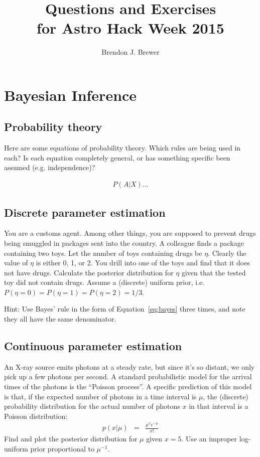 \documentclass[a4paper, 11pt]{article}
\title{Questions and Exercises\\
for Astro Hack Week 2015}
\author{Brendon J. Brewer}
\begin{document}
\maketitle

\section{Bayesian Inference}


\subsection{Probability theory}
Here are some equations of probability theory. Which rules are being used in
each? Is each equation completely general, or has something specific been
assumed (e.g. independence)?

\begin{eqnarray}
P(A | X) ...
\end{eqnarray}


\subsection{Discrete parameter estimation}
You are a customs agent. Among other things, you are supposed to prevent
drugs being smuggled in packages sent into the country. A colleague finds a
package containing two toys. Let the number of toys containing drugs be
$\eta$. Clearly the value of $\eta$ is either 0, 1, or 2. You drill into
one of the toys and find that it does not have drugs.
Calculate the posterior distribution for $\eta$ given that the tested
toy did not contain drugs. Assume a (discrete) uniform prior, i.e.
$P(\eta=0) = P(\eta=1) = P(\eta=2) = 1/3$.

{\tiny Hint: Use Bayes' rule in the form of Equation~\ref{eq:bayes}
three times, and note they all have the same denominator.}

\subsection{Continuous parameter estimation}
An X-ray source emits photons at a steady rate, but since it's so distant, we
only pick up a few photons per second.
A standard probabilistic model for the arrival times of the photons is the
``Poisson process''. A specific prediction of this model is that, if the
expected number of photons in a time interval
is $\mu$, the (discrete) probability distribution for the actual number of photons $x$ in that interval is a Poisson distribution:
\begin{eqnarray}
p(x | \mu) &=& \frac{\mu^x e^{-\mu}}{x!}
\end{eqnarray}
Find and plot the posterior distribution for $\mu$ given $x=5$. Use an improper
log-uniform prior proportional to $\mu^{-1}$.
\end{document}
